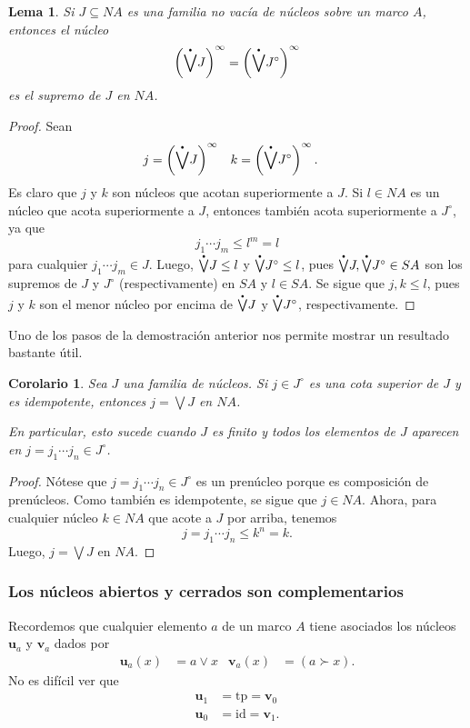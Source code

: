 \documentclass[12pt,letterpaper,titlepage]{article}
\newtheorem{lemma}{Lema}
\newtheorem*{cor}{Corolario}
\theoremstyle{definition}
\renewcommand\sup{\vee}
\newcommand\Sup{\bigvee}
\newcommand\pSup{%
    {\stackrel{\raisebox{-3pt}{\scalebox{0.5}{$\bullet$}}}{\bigvee}}
  }%
\newcommand\unuc[1]{\mathbf u_{#1}}
\newcommand\vnuc[1]{\mathbf v_{#1}}
\newcommand\<{\langle}
\renewcommand\>{\rangle}
\newcommand{\id}{\mathrm{id}}
\newcommand{\tp}{\mathrm{tp}}
\begin{document}
\begin{lemma}
  Si $J\subseteq NA$ es una familia no vacía de núcleos sobre un
  marco $A$, entonces el núcleo
  \[
    \left(\pSup J\right)^\infty = \left(\pSup J^\circ\right)^\infty
  \]
  es el supremo de $J$ en $NA$.
\end{lemma}
\begin{proof}
  Sean
  \begin{align*}
    j &= \left(\pSup J\right)^\infty &
    k &= \left(\pSup J^\circ\right)^\infty.
  \end{align*}
  Es claro que $j$ y $k$ son núcleos que acotan superiormente a
  $J$.
  Si $l\in NA$ es un núcleo que acota superiormente a $J$, entonces
  también acota superiormente a $J^\circ$, ya que
  \[
    j_1\cdots j_m \leq l^m = l
  \]
  para cualquier $j_1\cdots j_m\in J$.
  Luego, $\pSup J\leq l$ y $\pSup J^\circ \leq l$,
  pues $\pSup J,\pSup J^\circ\in SA$ son los supremos de $J$ y $J^\circ$
  (respectivamente) en $SA$ y $l\in SA$.
  Se sigue que $j,k\leq l$, pues $j$ y $k$ son el menor núcleo por
  encima de $\pSup J$ y $\pSup J^\circ$, respectivamente.
\end{proof}

Uno de los pasos de la demostración anterior
nos permite mostrar un resultado bastante útil.
\begin{cor}
    Sea $J$ una familia de núcleos.
    Si $j\in J^\circ$ es una cota superior de $J$
    y es idempotente, entonces $j=\Sup J$ en $NA$.
    
    En particular, esto sucede cuando $J$ es finito y todos los
    elementos de $J$ aparecen en $j=j_1\cdots j_n\in J^\circ$.
\end{cor}
\begin{proof}
    Nótese que $j=j_1\cdots j_n\in J^\circ$
    es un prenúcleo porque es composición de prenúcleos.
    Como también es idempotente, se sigue que $j\in NA$.
    Ahora, para cualquier núcleo $k\in NA$ que acote a $J$ por arriba,
    tenemos
    \[
        j = j_1\cdots j_n \leq k^n = k
    .\]
    Luego, $j=\Sup J$ en $NA$.
\end{proof}

\subsubsection{Los núcleos abiertos y cerrados son complementarios}

Recordemos que cualquier elemento $a$ de un marco $A$ tiene
asociados los núcleos $\unuc a$ y $\vnuc a$ dados por
\begin{align*}
  \unuc a(x) &= a\sup x
  &
  \vnuc a(x) &= (a\succ x).
\end{align*}
No es difícil ver que
\begin{align*}
  \unuc 1 &= \tp = \vnuc 0 \\
  \unuc 0 &= \id = \vnuc 1.
\end{align*}
\end{document}
